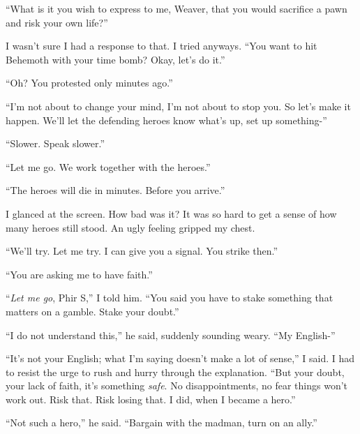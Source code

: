 ``What is it you wish to express to me, Weaver, that you would sacrifice a pawn and risk your own life?''



I wasn't sure I had a response to that.  I tried anyways.  ``You want to hit Behemoth with your time bomb?  Okay, let's do it.''



``Oh?  You protested only minutes ago.''



``I'm not about to change your mind, I'm not about to stop you.  So let's make it happen.  We'll let the defending heroes know what's up, set up something-''



``Slower.  Speak slower.''



``Let me go.  We work together with the heroes.''



``The heroes will die in minutes.  Before you arrive.''



I glanced at the screen.  How bad was it?  It was so hard to get a sense of how many heroes still stood.  An ugly feeling gripped my chest.



``We'll try.  Let me try.  I can give you a signal.  You strike then.''



``You are asking me to have faith.''



``\emph{Let me go}, Phir S,'' I told him.  ``You said you have to stake something that matters on a gamble.  Stake your doubt.''



``I do not understand this,'' he said, suddenly sounding weary.  ``My English-''



``It's not your English; what I'm saying doesn't make a lot of sense,'' I said.  I had to resist the urge to rush and hurry through the explanation.  ``But your doubt, your lack of faith, it's something \emph{safe}.  No disappointments, no fear things won't work out.    Risk that.  Risk losing that.  I did, when I became a hero.''



``Not such a hero,'' he said.  ``Bargain with the madman, turn on an ally.''



